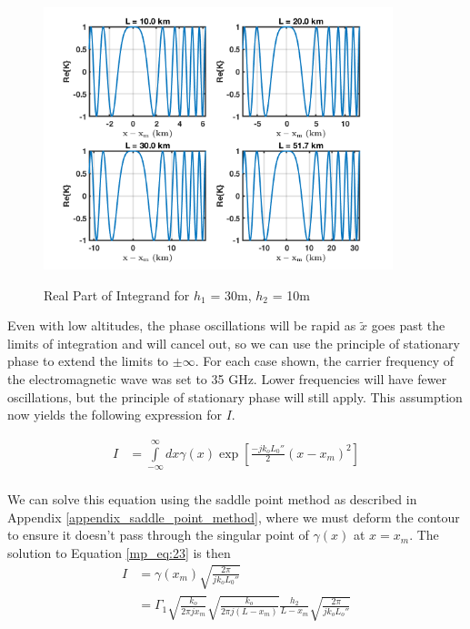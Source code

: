 \begin{figure}[H]
  \begin{center}
\includegraphics[width=4in]{../media/analysis/phaseVariation_30_50}
  \end{center}
  \renewcommand{\baselinestretch}{1} \small\normalsize
  \begin{quote}
  \caption[Real Part of Integrand for $h_1$ = 30m, $h_2$ = 50m]{ Real Part of Integrand for $h_1$ = 30m, $h_2$ = 10m\label{mp_fig:5}}
  \end{quote}
\end{figure}
\renewcommand{\baselinestretch}{2} \small\normalsize

Even with low altitudes, the phase oscillations will be rapid as $\tilde{x}$ goes past the limits of integration and will cancel out, so we can use the principle of stationary phase to extend the limits to $\pm\infty$. For each case shown, the carrier frequency of the electromagnetic wave was set to 35 GHz. Lower frequencies will have fewer oscillations, but the principle of stationary phase will still apply. This assumption now yields the following expression for $I$.

\begin{equation}
\begin{aligned}
I&=\int\limits_{-\infty}^{\infty}dx\gamma(x)\exp\left[\frac{-jk_oL_0''}{2}(x-x_m)^2\right]\\
\end{aligned}
\label{mp_eq:23}
\end{equation}

We can solve this equation using the saddle point method as described in Appendix \ref{appendix_saddle_point_method}, where we must deform the contour to ensure it doesn't pass through the singular point of $\gamma (x)$ at $x=x_m$. The solution to Equation \ref{mp_eq:23} is then
\begin{equation}
\begin{aligned}
I&=\gamma(x_m)\sqrt{\frac{2\pi}{jk_oL_0''}}\\
&=\Gamma_1 \sqrt{\frac{k_o}{2\pi jx_m}}\sqrt{\frac{k_o}{2\pi j (L-x_m)}}\frac{h_2}{L-x_m}\sqrt{\frac{2\pi}{jk_oL_o''}}\\
\end{aligned}
\label{mp_eq:23a}
\end{equation}

